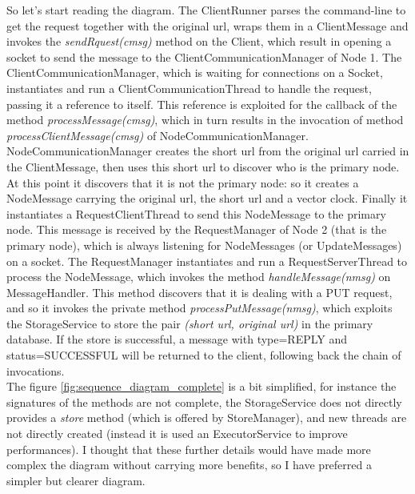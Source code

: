 \documentclass{article}
\begin{document}
So let's start reading the diagram. The ClientRunner parses the command-line to get the request together with the original url, wraps them in a ClientMessage and invokes the \textit{sendRquest(cmsg)} method on the Client, which result in opening a socket to send the message to the ClientCommunicationManager of Node 1. The ClientCommunicationManager, which is waiting for connections on a Socket, instantiates and run a ClientCommunicationThread to handle the request, passing it a reference to itself. This reference is exploited for the callback of the method \textit{processMessage(cmsg)}, which in turn results in the invocation of method \textit{processClientMessage(cmsg)} of NodeCommunicationManager. NodeCommunicationManager creates the short url from the original url carried in the ClientMessage, then uses this short url to discover who is the primary node. At this point it discovers that it is not the primary node: so it creates a NodeMessage carrying the original url, the short url and a vector clock. Finally it instantiates a RequestClientThread to send this NodeMessage to the primary node. This message is received by the RequestManager of Node 2 (that is the primary node), which is always listening for NodeMessages (or UpdateMessages) on a socket. The RequestManager instantiates and run a RequestServerThread to process the NodeMessage, which invokes the method \textit{handleMessage(nmsg)} on MessageHandler. This method discovers that it is dealing with a PUT request, and so it invokes the private method \textit{processPutMessage(nmsg)}, which exploits the StorageService to store the pair \textit{(short url, original url)} in the primary database. If the store is successful, a message with type=REPLY and status=SUCCESSFUL will be returned to the client, following back the chain of invocations. \\ The figure \ref{fig:sequence_diagram_complete} is a bit simplified, for instance the signatures of the methods are not complete, the StorageService does not directly provides a \textit{store} method (which is offered by StoreManager), and new threads are not directly created (instead it is used an ExecutorService to improve performances). I thought that these further details would have made more complex the diagram without carrying more benefits, so I have preferred a simpler but clearer diagram.	
\end{document}
